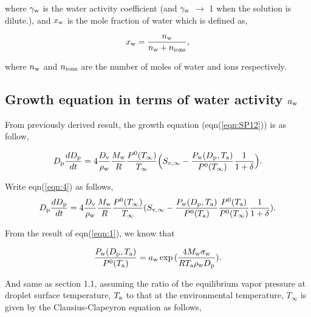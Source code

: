 \documentclass[12pt]{article}
\begin{document}
where $\gamma_{\rm w}$ is the water activity coefficient (and $\gamma_{\rm w}$ $\rightarrow$ 1 when the solution is dilute.), and $x_{\rm w}$ is the mole fraction of water which is defined as,

\begin{equation}\label{eqn:3}
x_{\rm w}=\frac{n_{\rm w}}{n_{\rm w}+n_{\rm ions}},
\end{equation}

where $n_{\rm w}$ and $n_{\rm ions}$ are the number of moles of water and ions respectively.


\subsection{Growth equation in terms of water activity $a_{\rm w}$}

From previously derived result, the growth equation (eqn(\ref{eqn:SP12})) is as follow,

\begin{equation}\label{eqn:4}
D_{\rm p}\frac{dD_{\rm p}}{dt}=4 \frac{D_{\rm v}} {\rho_{\rm w}} \frac{M_{\rm w}}{R} \frac{P^{\rm 0}(T_{\infty})} {T_{\infty}} \Big(S_{v, \infty} - \frac{P_{\rm w}(D_{\rm p}, T_{\rm a})}{P^{\rm 0}(T_{\infty})} \frac{1}{1+\delta}\Big).
\end{equation}

Write eqn(\ref{eqn:4}) as follows,
\begin{equation}\label{eqn:5}
D_{\rm p}\frac{dD_{\rm p}}{dt}=4 \frac{D_{\rm v}} {\rho_{\rm w}} \frac{M_{\rm w}}{R} \frac{P^{\rm 0}(T_{\infty})} {T_{\infty}} (S_{\rm v, \infty} - \frac{P_{\rm w}(D_{\rm p}, T_{\rm a})}{P^{\rm 0}(T_{\rm a})} \frac{P^{\rm 0}(T_{\rm a})}{P^{\rm 0}(T_{\infty})}\frac{1}{1+\delta}).
\end{equation}

From the result of eqn(\ref{eqn:1}), we know that 

\begin{equation}\label{eqn:6}
\frac{P_{\rm w}(D_{\rm p}, T_{\rm a})}{P^{\rm 0}(T_{\rm a})}=a_{\rm w}\exp{(\frac{4 M_{\rm w} \sigma_{\rm w}}{R T_{\rm a} \rho_{\rm w}D_{\rm p}})}.
\end{equation}

And same as section 1.1, assuming the ratio of the equilibrium vapor pressure at droplet surface temperature, $T_{\rm a}$ to that at the environmental temperature, $T_{\infty}$ is given by the Clausius-Clapeyron equation as follows,
  
\end{document}
